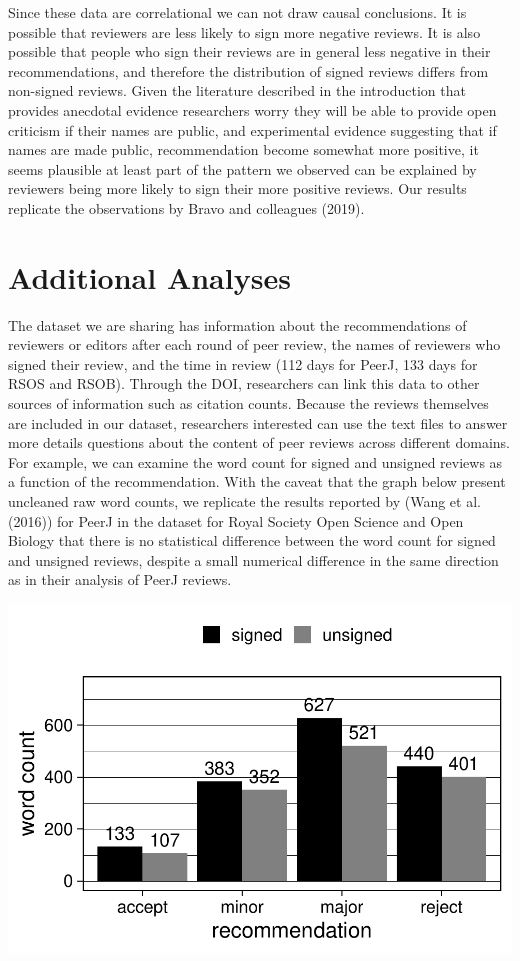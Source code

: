 \documentclass[,jou, a4paper,floatsintext]{apa6}
\begin{document}
Since these data are correlational we can not draw causal conclusions. It is possible that reviewers are less likely to sign more negative reviews. It is also possible that people who sign their reviews are in general less negative in their recommendations, and therefore the distribution of signed reviews differs from non-signed reviews. Given the literature described in the introduction that provides anecdotal evidence researchers worry they will be able to provide open criticism if their names are public, and experimental evidence suggesting that if names are made public, recommendation become somewhat more positive, it seems plausible at least part of the pattern we observed can be explained by reviewers being more likely to sign their more positive reviews. Our results replicate the observations by Bravo and colleagues (2019).

\hypertarget{additional-analyses}{%
\section{Additional Analyses}\label{additional-analyses}}

The dataset we are sharing has information about the recommendations of reviewers or editors after each round of peer review, the names of reviewers who signed their review, and the time in review (112 days for PeerJ, 133 days for RSOS and RSOB). Through the DOI, researchers can link this data to other sources of information such as citation counts. Because the reviews themselves are included in our dataset, researchers interested can use the text files to answer more details questions about the content of peer reviews across different domains. For example, we can examine the word count for signed and unsigned reviews as a function of the recommendation. With the caveat that the graph below present uncleaned raw word counts, we replicate the results reported by (Wang et al. (2016)) for PeerJ in the dataset for Royal Society Open Science and Open Biology that there is no statistical difference between the word count for signed and unsigned reviews, despite a small numerical difference in the same direction as in their analysis of PeerJ reviews.

\includegraphics{open_peer_review_files/figure-latex/wordcount-1.pdf}
\end{document}
